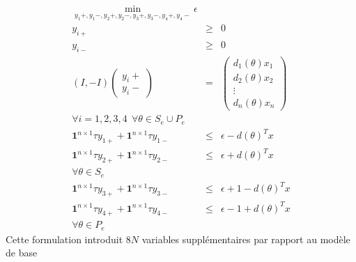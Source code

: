 \begin{eqnarray*}
\min_{y_1+,y_1-,y_2+,y_2-,y_3+,y_3-,y_4+,y_4-} \epsilon & & \\
y_{i+} & \geq & 0 \\
y_{i-} & \geq & 0 \\
(I,-I)
 \begin{pmatrix}
y_i+ \\
y_i-
\end{pmatrix}
& = & 
\begin{pmatrix}
d_1(\theta)x_1 \\
d_2(\theta)x_2 \\
\vdots \\
d_n(\theta)x_n 
\end{pmatrix} \\
\forall i = 1,2,3,4\:\:
\forall \theta \in S_e \cup P_e  & & \\
\mathbf{1}^{n\times 1}\tau y_{1+}+\mathbf{1}^{n\times 1}\tau y_{1-} & \leq & \epsilon -d(\theta)^Tx \\
\mathbf{1}^{n\times 1}\tau y_{2+}+\mathbf{1}^{n\times 1}\tau y_{2-} & \leq & \epsilon + d(\theta)^Tx \\
\forall \theta \in S_e & & \\
\mathbf{1}^{n\times 1}\tau y_{3+}+\mathbf{1}^{n\times 1}\tau y_{3-} & \leq & \epsilon +1 -d(\theta)^Tx \\
\mathbf{1}^{n\times 1}\tau y_{4+}+\mathbf{1}^{n\times 1}\tau y_{4-} & \leq & \epsilon -1 + d(\theta)^Tx \\
\forall \theta \in P_e & &
\end{eqnarray*}
Cette formulation introduit $8N$ variables supplémentaires par rapport au modèle de base
\FloatBarrier
